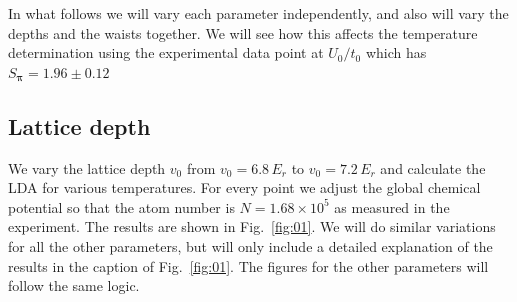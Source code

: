 \documentclass[11pt,letter]{article}
\newcommand{\bv}[1]{\ensuremath{\bm{#1}}}
\begin{document}
In what follows we will vary each parameter independently, and also will vary
the depths and the waists together.   We will see how this affects the
temperature determination using the experimental data point at $U_{0}/t_{0}$
which has $S_{\bv{\pi}} = 1.96 \pm 0.12 $ 

\subsection{ Lattice depth} 

We vary the lattice depth $v_{0}$ from $v_{0}=6.8\,E_{r}$ to $v_{0}=7.2\,E_{r}$
and calculate the LDA for various temperatures.   For every point we adjust the
global chemical potential  so that the atom number is $N=1.68\times 10^{5}$ as
measured in the experiment.   The results are shown in Fig.~\ref{fig:01}.  We
will do similar variations for all the other parameters,  but will only include
a detailed explanation of the results in the caption of Fig.~\ref{fig:01}.  The
figures for the other parameters will follow the same logic.  
\end{document}
